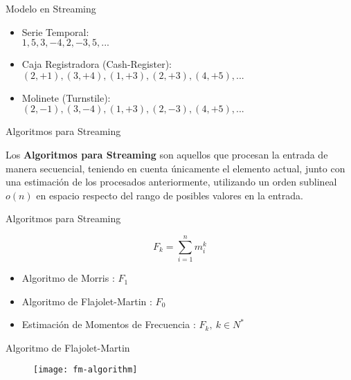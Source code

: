 \documentclass[12pt]{beamer}
\begin{document}
    \begin{frame}[fragile]{Modelo en Streaming}

    \begin{itemize}
      \item Serie Temporal:\\
        $1, 5, 3, -4, 2, -3, 5,...$
      \item Caja Registradora (Cash-Register): \\
        $(2, +1), (3, +4), (1, +3), (2, +3), (4, +5),...$
      \item Molinete (Turnstile): \\
        $(2, -1), (3, -4), (1, +3), (2, -3), (4, +5),...$
    \end{itemize}

  \end{frame}

    \begin{frame}[fragile]{Algoritmos para Streaming}

      Los \textbf{Algoritmos para Streaming} son aquellos que procesan la entrada de manera secuencial, teniendo en cuenta únicamente el elemento actual, junto con una estimación de los procesados anteriormente, utilizando un orden sublineal $o(n)$ en espacio respecto del rango de posibles valores en la entrada.

    \end{frame}

    \begin{frame}[fragile]{Algoritmos para Streaming}

      \begin{equation}
        F_k = \sum_{i=1}^n m_i^k
      \end{equation}

      \begin{itemize}
        \item Algoritmo de Morris \cite{morris1978counting}: $F_1$
        \item Algoritmo de Flajolet-Martin \cite{flajolet1985probabilistic}: $F_0$
        \item Estimación de Momentos de Frecuencia \cite{alon1996space}: $F_k, \ k \in N^*$
      \end{itemize}

    \end{frame}

    \begin{frame}[fragile]{Algoritmo de Flajolet-Martin}

      \begin{figure}
        \texttt{[image: fm-algorithm]}
        \caption{}
      \end{figure}

    \end{frame}
\end{document}
